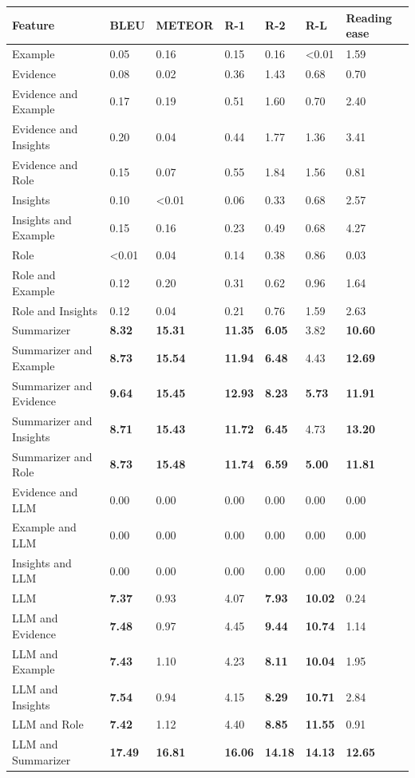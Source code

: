 \begin{tabular}{|l|l|l|l|l|l|l|}
\hline
\textbf{Feature} & BLEU & METEOR & R-1 & R-2 & R-L & Reading ease \\
 \hline
 Example & 0.05 & 0.16 & 0.15 & 0.16 & \textless{}0.01 & 1.59 \\
 \hline
 Evidence & 0.08 & 0.02 & 0.36 & 1.43 & 0.68 & 0.70 \\
 \hline
 Evidence and Example & 0.17 & 0.19 & 0.51 & 1.60 & 0.70 & 2.40 \\
 \hline
 Evidence and Insights & 0.20 & 0.04 & 0.44 & 1.77 & 1.36 & 3.41 \\
 \hline
 Evidence and Role & 0.15 & 0.07 & 0.55 & 1.84 & 1.56 & 0.81 \\
 \hline
 Insights & 0.10 & \textless{}0.01 & 0.06 & 0.33 & 0.68 & 2.57 \\
 \hline
 Insights and Example & 0.15 & 0.16 & 0.23 & 0.49 & 0.68 & 4.27 \\
 \hline
 Role & \textless{}0.01 & 0.04 & 0.14 & 0.38 & 0.86 & 0.03 \\
 \hline
 Role and Example & 0.12 & 0.20 & 0.31 & 0.62 & 0.96 & 1.64 \\
 \hline
 Role and Insights & 0.12 & 0.04 & 0.21 & 0.76 & 1.59 & 2.63 \\
 \hline
 Summarizer & \textbf{8.32} & \textbf{15.31} & \textbf{11.35} & \textbf{6.05} & 3.82 & \textbf{10.60} \\
 \hline
 Summarizer and Example & \textbf{8.73} & \textbf{15.54} & \textbf{11.94} & \textbf{6.48} & 4.43 & \textbf{12.69} \\
 \hline
 Summarizer and Evidence & \textbf{9.64} & \textbf{15.45} & \textbf{12.93} & \textbf{8.23} & \textbf{5.73} & \textbf{11.91} \\
 \hline
 Summarizer and Insights & \textbf{8.71} & \textbf{15.43} & \textbf{11.72} & \textbf{6.45} & 4.73 & \textbf{13.20} \\
 \hline
 Summarizer and Role & \textbf{8.73} & \textbf{15.48} & \textbf{11.74} & \textbf{6.59} & \textbf{5.00} & \textbf{11.81} \\
 \hline
 Evidence and LLM & 0.00 & 0.00 & 0.00 & 0.00 & 0.00 & 0.00 \\
 \hline
 Example and LLM & 0.00 & 0.00 & 0.00 & 0.00 & 0.00 & 0.00 \\
 \hline
 Insights and LLM & 0.00 & 0.00 & 0.00 & 0.00 & 0.00 & 0.00 \\
 \hline
 LLM & \textbf{7.37} & 0.93 & 4.07 & \textbf{7.93} & \textbf{10.02} & 0.24 \\
 \hline
 LLM and Evidence & \textbf{7.48} & 0.97 & 4.45 & \textbf{9.44} & \textbf{10.74} & 1.14 \\
 \hline
 LLM and Example & \textbf{7.43} & 1.10 & 4.23 & \textbf{8.11} & \textbf{10.04} & 1.95 \\
 \hline
 LLM and Insights & \textbf{7.54} & 0.94 & 4.15 & \textbf{8.29} & \textbf{10.71} & 2.84 \\
 \hline
 LLM and Role & \textbf{7.42} & 1.12 & 4.40 & \textbf{8.85} & \textbf{11.55} & 0.91 \\
 \hline
 LLM and Summarizer & \textbf{17.49} & \textbf{16.81} & \textbf{16.06} & \textbf{14.18} & \textbf{14.13} & \textbf{12.65} \\
\hline
\end{tabular}
